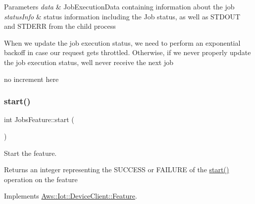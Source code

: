 \begin{DoxyParams}{Parameters}
{\em data} & Job\+Execution\+Data containing information about the job \\
\hline
{\em status\+Info} & status information including the Job status, as well as S\+T\+D\+O\+UT and S\+T\+D\+E\+RR from the child process \\
\hline
\end{DoxyParams}
When we update the job execution status, we need to perform an exponential backoff in case our request gets throttled. Otherwise, if we never properly update the job execution status, we\textquotesingle{}ll never receive the next job

no increment here \mbox{\label{class_aws_1_1_iot_1_1_device_client_1_1_jobs_1_1_jobs_feature_a6369b1914ce964ca98c9474a38e3214f}} 
\subsubsection{\texorpdfstring{start()}{start()}}
{\footnotesize\ttfamily int Jobs\+Feature\+::start (\begin{DoxyParamCaption}{ }\end{DoxyParamCaption})\hspace{0.3cm}{\ttfamily [virtual]}}



Start the feature. 

\begin{DoxyReturn}{Returns}
an integer representing the S\+U\+C\+C\+E\+SS or F\+A\+I\+L\+U\+RE of the \hyperlink{class_aws_1_1_iot_1_1_device_client_1_1_jobs_1_1_jobs_feature_a6369b1914ce964ca98c9474a38e3214f}{start()} operation on the feature 
\end{DoxyReturn}


Implements \hyperlink{class_aws_1_1_iot_1_1_device_client_1_1_feature_ac9a936ebd88f7e35914a6aac99badf7d}{Aws\+::\+Iot\+::\+Device\+Client\+::\+Feature}.

\mbox{\label{class_aws_1_1_iot_1_1_device_client_1_1_jobs_1_1_jobs_feature_a4a976be8e597b38a1eeaaadc6d048739}} 
